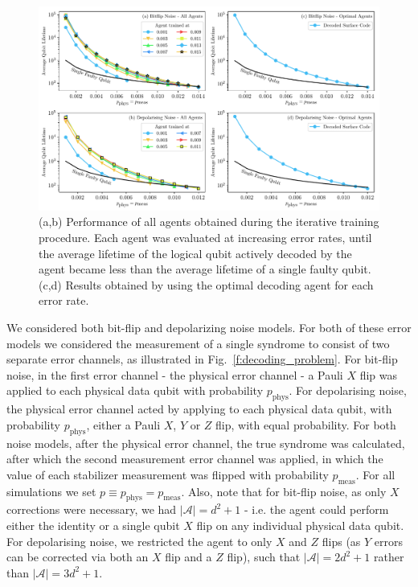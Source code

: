 \documentclass[twocolumn,preprintnumbers,amsmath,amssymb,notitlepage,nofootinbib,longbibliography,superscriptaddress,aps,pra,10pt]{revtex4-1}
\begin{document}
	\begin{figure}
		\centering
		\includegraphics[width=\linewidth]{figures/final_results.pdf}
		\caption{(a,b) Performance of all agents obtained during the iterative training procedure. Each agent was evaluated at increasing error rates, until the average lifetime of the logical qubit actively decoded by the agent became less than the average lifetime of a single faulty qubit. (c,d) Results obtained by using the optimal decoding agent for each error rate.}\label{f:results}
	\end{figure}

	We considered both bit-flip and depolarizing noise models.
	For both of these error models we considered the measurement of a single syndrome to consist of two separate error channels, as illustrated in Fig.~\ref{f:decoding_problem}.
	For bit-flip noise, in the first error channel - the physical error channel - a Pauli $X$ flip was applied to each physical data qubit with probability $p_{\mathrm{phys}}$.
	For depolarising noise, the physical error channel acted by applying to each physical data qubit, with probability $p_{\mathrm{phys}}$, either a Pauli $X$, $Y$ or $Z$
	flip, with equal probability.
	For both noise models, after the physical error channel, the true syndrome was calculated, after which the second measurement error channel was applied, in
	which the value of each stabilizer measurement was flipped with probability $p_{\mathrm{meas}}$.
	For all simulations we set $p \equiv p_{\mathrm{phys}} = p_{\mathrm{meas}}$.
	Also, note that for bit-flip noise, as only $X$ corrections were necessary, we had $|\mathcal{A}| = d^2 + 1$ - i.e. the agent could perform either the identity or
	a single qubit $X$ flip on any individual physical data qubit.
	For depolarising noise, we restricted the agent to only $X$ and $Z$ flips (as $Y$ errors can be corrected via both an $X$ flip and a $Z$ flip), such
	that $|\mathcal{A}| = 2d^2 + 1$ rather than $|\mathcal{A}| = 3d^2 + 1$.
\end{document}
